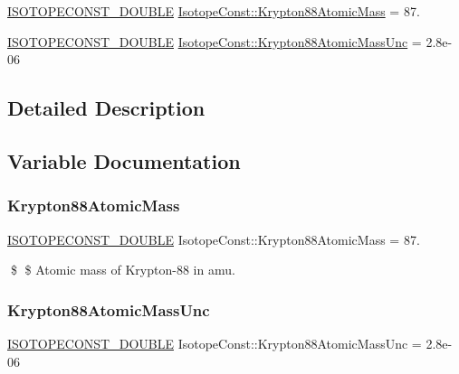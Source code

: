 \begin{DoxyCompactItemize}
\item 
\mbox{\hyperlink{group___isotope_const-_macros_ga8f45a7272ce02c0b4c65c44636ed719a}{I\+S\+O\+T\+O\+P\+E\+C\+O\+N\+S\+T\+\_\+\+D\+O\+U\+B\+LE}} \mbox{\hyperlink{group___isotope_const-_krypton-_kr88_gacba5078f9830cd36d108b3ba29da62d7}{Isotope\+Const\+::\+Krypton88\+Atomic\+Mass}} = 87.
\item 
\mbox{\hyperlink{group___isotope_const-_macros_ga8f45a7272ce02c0b4c65c44636ed719a}{I\+S\+O\+T\+O\+P\+E\+C\+O\+N\+S\+T\+\_\+\+D\+O\+U\+B\+LE}} \mbox{\hyperlink{group___isotope_const-_krypton-_kr88_gad075142c2ef8e42e6c8badc822d07ea3}{Isotope\+Const\+::\+Krypton88\+Atomic\+Mass\+Unc}} = 2.\+8e-\/06
\end{DoxyCompactItemize}


\subsection{Detailed Description}


\subsection{Variable Documentation}
\mbox{\label{group___isotope_const-_krypton-_kr88_gacba5078f9830cd36d108b3ba29da62d7}} 
\subsubsection{\texorpdfstring{Krypton88\+Atomic\+Mass}{Krypton88AtomicMass}}
{\footnotesize\ttfamily \mbox{\hyperlink{group___isotope_const-_macros_ga8f45a7272ce02c0b4c65c44636ed719a}{I\+S\+O\+T\+O\+P\+E\+C\+O\+N\+S\+T\+\_\+\+D\+O\+U\+B\+LE}} Isotope\+Const\+::\+Krypton88\+Atomic\+Mass = 87.}

\$ \$ Atomic mass of Krypton-\/88 in amu. \mbox{\label{group___isotope_const-_krypton-_kr88_gad075142c2ef8e42e6c8badc822d07ea3}} 
\subsubsection{\texorpdfstring{Krypton88\+Atomic\+Mass\+Unc}{Krypton88AtomicMassUnc}}
{\footnotesize\ttfamily \mbox{\hyperlink{group___isotope_const-_macros_ga8f45a7272ce02c0b4c65c44636ed719a}{I\+S\+O\+T\+O\+P\+E\+C\+O\+N\+S\+T\+\_\+\+D\+O\+U\+B\+LE}} Isotope\+Const\+::\+Krypton88\+Atomic\+Mass\+Unc = 2.\+8e-\/06}

